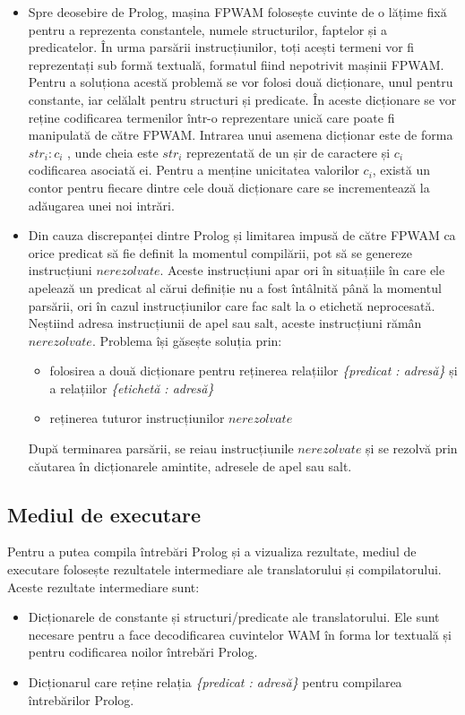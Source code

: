 \documentclass[12pt,a4paper,twoside]{report}
\begin{document}
\begin{itemize}
\item Spre deosebire de Prolog, mașina FPWAM folosește cuvinte de o lățime fixă pentru a reprezenta constantele, numele structurilor, faptelor și a predicatelor. În urma parsării instrucțiunilor, toți acești termeni vor fi reprezentați sub formă textuală, formatul fiind nepotrivit mașinii FPWAM. Pentru a soluționa acestă problemă se vor folosi două dicționare, unul pentru constante, iar celălalt pentru structuri și predicate. În aceste dicționare se vor reține codificarea termenilor într-o reprezentare unică care poate fi manipulată de către FPWAM. Intrarea unui asemena dicționar este de forma ${str_i : c_i}$ , unde cheia este $str_i$ reprezentată de un șir de caractere și $c_i$ codificarea asociată ei. Pentru a menține unicitatea valorilor $c_i$, există un contor pentru fiecare dintre cele două dicționare care se incrementează la adăugarea unei noi intrări.
\item Din cauza discrepanței dintre Prolog și limitarea impusă de către FPWAM ca orice predicat să fie definit la momentul compilării, pot să se genereze instrucțiuni $nerezolvate$. Aceste instrucțiuni apar ori în situațiile în care ele apelează un predicat al cărui definiție nu a fost întâlnită până la momentul parsării, ori în cazul instrucțiunilor care fac salt la o etichetă neprocesată. Neștiind adresa instrucțiunii de apel sau salt, aceste instrucțiuni rămân $nerezolvate$. Problema își găsește soluția prin:
	\begin{itemize}
	\item folosirea a două dicționare pentru reținerea relațiilor \textit{\{predicat : adresă\}} și a relațiilor \textit{\{etichetă : adresă\}}
	\item reținerea tuturor instrucțiunilor $nerezolvate$
	\end{itemize}
După terminarea parsării, se reiau instrucțiunile $nerezolvate$ și se rezolvă prin căutarea în dicționarele amintite, adresele de apel sau salt.
\end{itemize}

\subsection{Mediul de executare}
Pentru a putea compila întrebări Prolog și a vizualiza rezultate, mediul de executare folosește rezultatele intermediare ale translatorului și compilatorului. Aceste rezultate intermediare sunt: 
\begin{itemize}
\item Dicționarele de constante și structuri/predicate ale translatorului. Ele sunt necesare pentru a face decodificarea cuvintelor WAM în forma lor textuală și pentru codificarea noilor întrebări Prolog.
\item Dicționarul care reține relația \textit{\{predicat : adresă\}} pentru compilarea întrebărilor Prolog.
\end{itemize}
\end{document}
